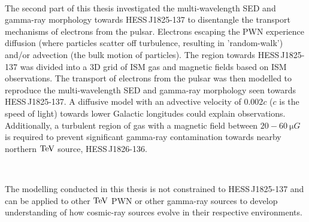 \par~\par
The second part of this thesis investigated the multi-wavelength SED and gamma-ray morphology towards \mbox{HESS\,J1825-137} to disentangle the transport mechanisms of electrons from the pulsar. Electrons escaping the PWN experience diffusion (where particles scatter off turbulence, resulting in 'random-walk') and/or advection (the bulk motion of particles). The region towards \mbox{HESS\,J1825-137} was divided into a 3D grid of ISM gas and magnetic fields based on ISM observations. The transport of electrons from the pulsar was then modelled to reproduce the multi-wavelength SED and gamma-ray morphology seen towards \mbox{HESS\,J1825-137}. A diffusive model with an advective velocity of $0.002c$ ($c$ is the speed of light) towards lower Galactic longitudes could explain observations. Additionally, a turbulent region of gas with a magnetic field between $20-60~\si{\micro G}$ is required to prevent significant gamma-ray contamination towards nearby northern $\TeV$ source, \mbox{HESS\,J1826-136}.
\par~\par
The modelling conducted in this thesis is not constrained to \mbox{HESS\,J1825-137} and can be applied to other $\TeV$ PWN or other gamma-ray sources to develop understanding  of how cosmic-ray sources evolve in their respective environments.